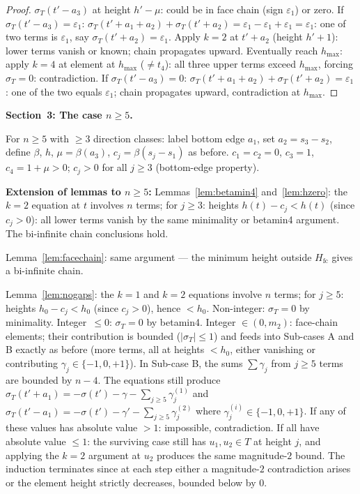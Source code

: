 \documentclass{article}
\begin{document}
\begin{proof}
$\sigma_T(t'-a_3)$ at height $h'-\mu$: could be in face chain (sign $\varepsilon_1$) or zero.
If $\sigma_T(t'-a_3)=\varepsilon_1$: $\sigma_T(t'+a_1+a_2)+\sigma_T(t'+a_2)=\varepsilon_1-\varepsilon_1+\varepsilon_1=\varepsilon_1$: one of two terms is $\varepsilon_1$, say $\sigma_T(t'+a_2)=\varepsilon_1$.
Apply $k=2$ at $t'+a_2$ (height $h'+1$): lower terms vanish or known; chain propagates upward.
Eventually reach $h_{\max}$: apply $k=4$ at element at $h_{\max}$ ($\ne t_4$): all three upper terms exceed $h_{\max}$, forcing $\sigma_T=0$: contradiction.
If $\sigma_T(t'-a_3)=0$: $\sigma_T(t'+a_1+a_2)+\sigma_T(t'+a_2)=\varepsilon_1$: one of the two equals $\varepsilon_1$; chain propagates upward, contradiction at $h_{\max}$.
\end{proof}

\bigskip
\noindent\textbf{Section~3: The case $n\ge 5$.}

For $n\ge 5$ with $\ge 3$ direction classes: label bottom edge $a_1$, set $a_2=s_3-s_2$,
define $\beta$, $h$, $\mu=\beta(a_3)$, $c_j=\beta(s_j-s_1)$ as before.
$c_1=c_2=0$, $c_3=1$, $c_4=1+\mu>0$; $c_j>0$ for all $j\ge 3$ (bottom-edge property).

\textbf{Extension of lemmas to $n\ge 5$:}
Lemmas~\ref{lem:betamin4} and~\ref{lem:hzero}: the $k=2$ equation at $t$ involves $n$ terms;
for $j\ge 3$: heights $h(t)-c_j<h(t)$ (since $c_j>0$): all lower terms vanish by the same minimality or betamin4 argument.  The bi-infinite chain conclusions hold. \checkmark

Lemma~\ref{lem:facechain}: same argument — the minimum height outside $H_{\mathrm{fc}}$ gives a bi-infinite chain. \checkmark

Lemma~\ref{lem:nogaps}: the $k=1$ and $k=2$ equations involve $n$ terms;
for $j\ge 5$: heights $h_0-c_j<h_0$ (since $c_j>0$), hence $<h_0$.
Non-integer: $\sigma_T=0$ by minimality.  Integer~$\le 0$: $\sigma_T=0$ by betamin4.
Integer $\in(0,m_2)$: face-chain elements; their contribution is bounded ($|\sigma_T|\le 1$)
and feeds into Sub-cases A and B exactly as before (more terms, all at heights $<h_0$,
either vanishing or contributing $\gamma_j\in\{-1,0,+1\}$).
In Sub-case B, the sums $\sum\gamma_j$ from $j\ge 5$ terms are bounded by $n-4$.
The equations still produce $\sigma_T(t'+a_1)=-\sigma(t')-\gamma-\sum_{j\ge 5}\gamma_j^{(1)}$
and $\sigma_T(t'-a_1)=-\sigma(t')-\gamma'-\sum_{j\ge 5}\gamma_j^{(2)}$ where $\gamma_j^{(i)}\in\{-1,0,+1\}$.
If any of these values has absolute value $>1$: impossible, contradiction.
If all have absolute value $\le 1$: the surviving case still has $u_1,u_2\in T$ at height $j$,
and applying the $k=2$ argument at $u_2$ produces the same magnitude-$2$ bound.
The induction terminates since at each step either a magnitude-$2$ contradiction arises
or the element height strictly decreases, bounded below by $0$. \checkmark
\end{document}
